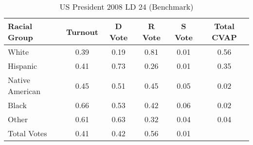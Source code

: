 \begin{table}[htb]
\begin{center}
\caption{US President 2008 LD 24 (Benchmark)}
\label{pres08_cvap_ld_24_benchmark}
\begin{tabular}{lccccc}
  \hline
Racial Group & Turnout & D Vote & R Vote & S Vote & Total CVAP \\ 
  \hline
White & 0.39 & 0.19 & 0.81 & 0.01 & 0.56 \\ 
  Hispanic & 0.41 & 0.73 & 0.26 & 0.01 & 0.35 \\ 
  Native American & 0.45 & 0.51 & 0.45 & 0.05 & 0.02 \\ 
  Black & 0.66 & 0.53 & 0.42 & 0.06 & 0.02 \\ 
  Other & 0.61 & 0.63 & 0.32 & 0.04 & 0.04 \\ 
  Total Votes & 0.41 & 0.42 & 0.56 & 0.01 &  \\ 
   \hline
\end{tabular}
\end{center}
\end{table}
